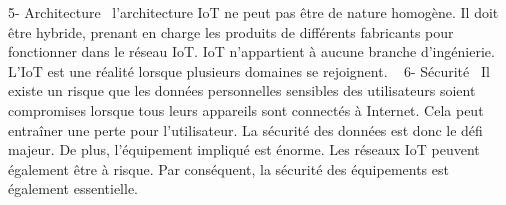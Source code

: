 5- Architecture \newline l’architecture IoT ne peut pas être de nature homogène. Il doit être hybride, prenant en charge les produits de différents fabricants pour fonctionner dans le réseau IoT. IoT n’appartient à aucune branche d’ingénierie. L’IoT est une réalité lorsque plusieurs domaines se rejoignent.\newline  
6- Sécurité \newline Il existe un risque que les données personnelles sensibles des utilisateurs soient compromises lorsque tous leurs appareils sont connectés à Internet. Cela peut entraîner une perte pour l’utilisateur. La sécurité des données est donc le défi majeur. De plus, l’équipement impliqué est énorme. Les réseaux IoT peuvent également être à risque. Par conséquent, la sécurité des équipements est également essentielle.